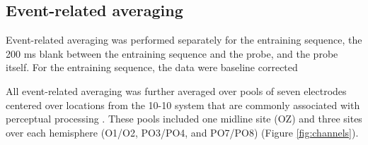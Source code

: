 \documentclass[defaultstyle,12pt]{article}
\begin{document}
\subsection{Event-related averaging}
Event-related averaging was performed separately for the entraining sequence, the 200 ms blank between the entraining sequence and the probe, and the probe itself. For the entraining sequence, the data were baseline corrected

All event-related averaging was further averaged over pools of seven electrodes centered over locations from the 10-10 system that are commonly associated with perceptual processing \cite[e.g.,]{DohertyRaoMesulamEtAl05,RohenkohlNobre11}. These pools included one midline site (OZ) and three sites over each hemisphere (O1/O2, PO3/PO4, and PO7/PO8) (Figure \ref{fig:channels}).

\end{document}
